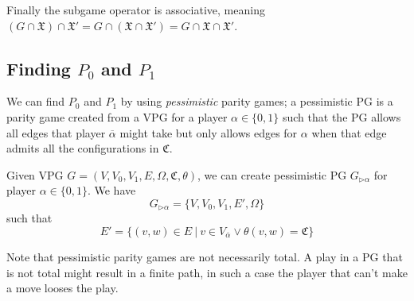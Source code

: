 Finally the subgame operator is associative, meaning $(G \cap \mathfrak{X}) \cap \mathfrak{X}' = G \cap (\mathfrak{X} \cap \mathfrak{X}') = G \cap \mathfrak{X} \cap \mathfrak{X}'$.

\subsection{Finding $P_0$ and $P_1$}
We can find $P_0$ and $P_1$ by using \textit{pessimistic} parity games; a pessimistic PG is a parity game created from a VPG for a player $\alpha \in \{0,1\}$ such that the PG allows all edges that player $\overline{\alpha}$ might take but only allows edges for $\alpha$ when that edge admits all the configurations in $\mathfrak{C}$.
\begin{definition}
	\label{def_pess_game}
	Given VPG $G = (V,V_0,V_1,E,\Omega, \mathfrak{C},\theta)$, we can create pessimistic PG $G_{\triangleright\alpha}$ for player $\alpha \in \{0,1\}$. We have	
	\[ G_{\triangleright\alpha} = \{V,V_0,V_1,E',\Omega \} \]
	such that
	\[ E' = \{ (v,w) \in E\ |\ v \in V_{\overline{\alpha}} \vee \theta(v,w) = \mathfrak{C} \} \]
\end{definition}


Note that pessimistic parity games are not necessarily total. A play in a PG that is not total might result in a finite path, in such a case the player that can't make a move looses the play.

